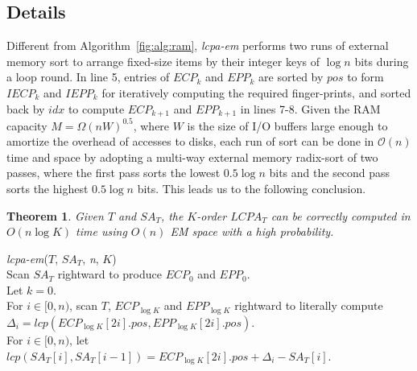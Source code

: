 \documentclass{llncs}
\newtheorem{thm}{Theorem}
\begin{document}
\subsection{Details}
Different from Algorithm~\ref{fig:alg:ram}, {\em lcpa-em} performs two runs of external memory sort to arrange fixed-size items by their integer keys of $\log n$ bits during a loop round. In line 5, entries of $ECP_k$ and $EPP_k$ are sorted by $pos$ to form $IECP_k$ and $IEPP_k$ for iteratively computing the required finger-prints, and sorted back by $idx$ to compute $ECP_{k+1}$ and $EPP_{k+1}$ in lines 7-8. Given the {RAM} capacity $M=\Omega(nW)^{0.5}$, where $W$ is the size of {I/O} buffers large enough to amortize the overhead of accesses to disks, each run of sort can be done in $\mathcal{O}(n)$ time and space by adopting a multi-way external memory radix-sort of two passes, where the first pass sorts the lowest $0.5\log n$ bits and the second pass sorts the highest $0.5\log n$ bits. This leads us to the following conclusion.

\begin{thm}
\label{thm:lcp:em}
Given $T$ and $SA_T$, the $K$-order $LCPA_T$ can be correctly computed in $O(n \log K)$ time using $O(n)$ {EM} space with a high probability.
\end{thm}

\begin{algorithm}[hbtp!]
\caption{Compute $K$-Order $LCPA_T$ in EM}
\label{fig:alg:em}
{\em lcpa-em}($T$, $SA_T$, {\em n}, $K$){\\
\SetAlgoNoLine
Scan $SA_T$ rightward to produce $ECP_0$ and $EPP_0$.\\
Let $k = 0$. \\
\While{$k < \log K$}{
\Indentp{-1em}
Radix-sort $ECP_k$ and $EPP_k$ by $pos$ to form $IECP_k$ and $IEPP_k$. \\
For $i\in [0,n)$ and $j\in [0,2n)$, scan $T$ rightward to iteratively compute the finger-print of ${\sf pre}(T,i)$ and set $IECP_k[j].fp$ or $IEPP_k[j].fp$ to $FP[0,i]$ if $IECP_k[j].pos = i$ or $IEPP_k[j].pos = i$. \\
Radix-sort $IECP_k$ and $IEPP_k$ back to $ECP_k$ and $EPP_k$ by $idx$. \\
For $i \in [0,n)$, scan $ECP_k$ and $EPP_k$ rightward to compute each pair of $(FP[ECP_k[2i].pos+1,ECP_k[2i+1].pos], FP[EPP_k[2i].pos+1,EPP_k[2i+1].pos])$ and compare them to generate $ECP_{k+1}$ and $EPP_{k+1}$. \\
Let $k = k + 1$. \\
}
For $i \in [0,n)$, scan $T$, $ECP_{\log K}$ and $EPP_{\log K}$ rightward to literally compute $\Delta_i = lcp(ECP_{\log K}[2i].pos,EPP_{\log K}[2i].pos)$. \\
For $i \in [0,n)$, let $lcp(SA_T[i],SA_T[i-1])=ECP_{\log K}[2i].pos+\Delta_i-SA_T[i]$.\\
}
\end{algorithm}
\end{document}
